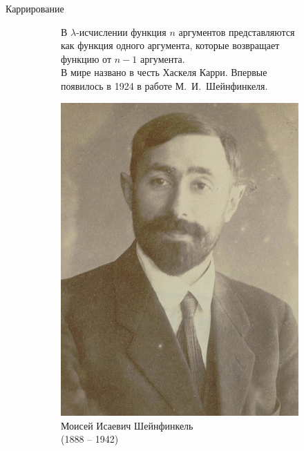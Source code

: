 \begin{frame}{Каррирование%
  }

\begin{figure}[t]
  \begin{subfigure}[t]{0.5\textwidth}
    \vspace{-4em}
В $\lambda$-исчислении функция $n$ аргументов представляются как функция одного аргумента, которые возвращает функцию от $n-1$ аргумента.\\

В мире названо в честь Хаскеля Карри. Впервые появилось в 1924 в работе М.~И.~Шейнфинкеля.\\


  \end{subfigure}
\hspace{1cm}
  \begin{subfigure}[t]{0.3\textwidth}
      \begin{minipage}{1\textwidth}
    \vspace{-3mm}  \includegraphics[width=1\textwidth]{440px-Moses_Schonfinkel_1922_(cropped).jpg}\\
      \centering
  Моисей Исаевич Шейнфинкель \\
  (1888 -- 1942)
\end{minipage}
  \end{subfigure}
\end{figure}
\end{frame}



